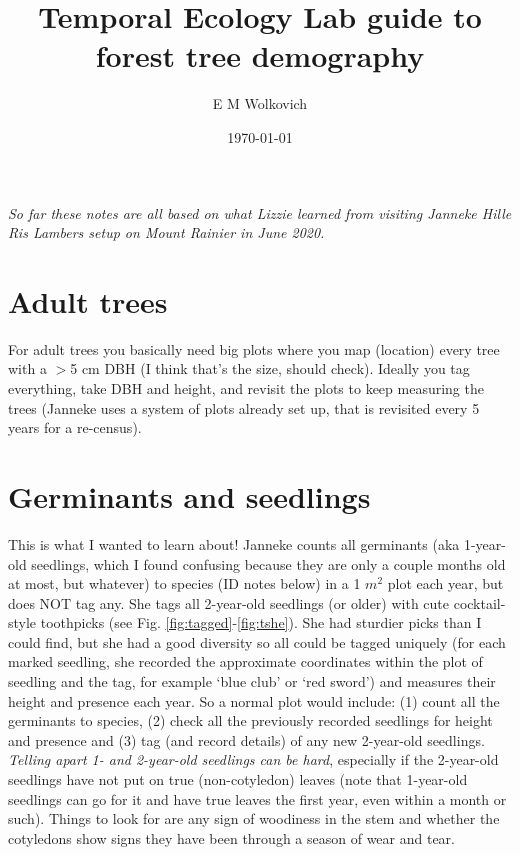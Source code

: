 \documentclass[11pt,letter]{article}
\begin{document}

\renewcommand{\refname}{\CHead{}}

\title{Temporal Ecology Lab guide to\\ forest tree demography} 
\author{E M Wolkovich} 
\date{\today}
\maketitle

\emph{So far these notes are all based on what Lizzie learned from visiting Janneke Hille Ris Lambers setup on Mount Rainier in June 2020.}
\section{Adult trees}

For adult trees you basically need big plots where you map (location) every tree with a $>$5 cm DBH (I think that's the size, should check). Ideally you tag everything, take DBH and height, and revisit the plots to keep measuring the trees (Janneke uses a system of plots already set up, that is revisited every 5 years for a re-census).

\section{Germinants and seedlings}

This is what I wanted to learn about! Janneke counts all germinants (aka 1-year-old seedlings, which I found confusing because they are only a couple months old at most, but whatever) to species (ID notes below) in a 1 $m^2$ plot each year, but does NOT tag any. She tags all 2-year-old seedlings (or older) with cute cocktail-style toothpicks (see Fig. \ref{fig:tagged}-\ref{fig:tshe}). She had sturdier picks than I could find, but she had a good diversity so all could be tagged uniquely (for each marked seedling, she recorded the approximate coordinates within the plot of seedling and the tag, for example `blue club' or `red sword') and measures their height and presence each year. So a normal plot would include: (1) count all the germinants to species, (2) check all the previously recorded seedlings for height and presence and (3) tag (and record details) of any new 2-year-old seedlings.\\

\emph{Telling apart 1- and 2-year-old seedlings can be hard}, especially if the 2-year-old seedlings have not put on true (non-cotyledon) leaves (note that 1-year-old seedlings can go for it and have true leaves the first year, even within a month or such). Things to look for are any sign of woodiness in the stem and whether the cotyledons show signs they have been through a season of wear and tear. \\
\end{document}
